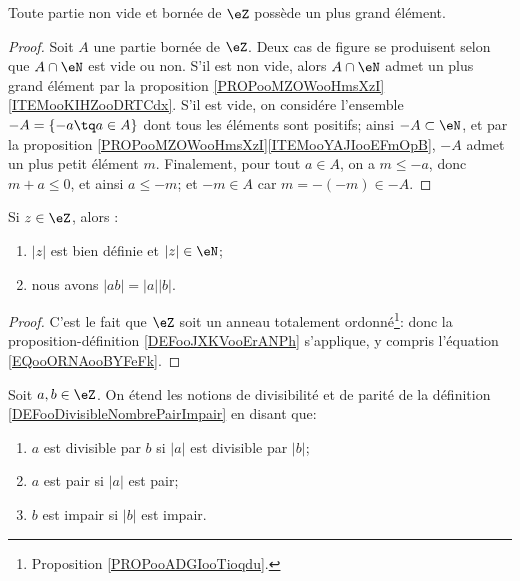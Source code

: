 \begin{lemma}       \label{LEMooMYEIooNFwNVI}
	Toute partie non vide et bornée de \( \eZ\) possède un plus grand élément.
\end{lemma}

\begin{proof}
	Soit \( A \) une partie bornée de \( \eZ\). Deux cas de figure se produisent selon que \( A \cap \eN \) est vide ou non. S'il est non vide, alors \( A \cap \eN \) admet un plus grand élément par la proposition \ref{PROPooMZOWooHmsXzI}\ref{ITEMooKIHZooDRTCdx}. S'il est vide, on considére l'ensemble \( -A = \{-a \tq a \in A \} \) dont tous les éléments sont positifs; ainsi \( -A \subset \eN \), et par la proposition \ref{PROPooMZOWooHmsXzI}\ref{ITEMooYAJIooEFmOpB}, \( -A \) admet un plus petit élément \( m \). Finalement, pour tout \( a \in A \), on a \( m \leq -a \), donc \( m+a \leq 0 \), et ainsi \( a \leq -m \); et \( -m \in A \) car \( m = -(-m) \in -A \).
\end{proof}

\begin{proposition}	\label{PROPooRelatifsValAbs}
	Si \( z \in \eZ \), alors :
	\begin{enumerate}
		\item
		      \( |z| \) est bien définie et \( |z| \in \eN \);
		\item
		      nous avons \( | ab |=| a || b | \).
	\end{enumerate}
\end{proposition}

\begin{proof}
	C'est le fait que \( \eZ\) soit un anneau totalement ordonné\footnote{Proposition \ref{PROPooADGIooTioqdu}.}: donc la proposition-définition \ref{DEFooJXKVooErANPh} s'applique, y compris l'équation \eqref{EQooORNAooBYFeFk}.
\end{proof}


\begin{definition}	\label{DEFooRelatifsDiviseurParite}
	Soit \( a, b \in \eZ \). On étend les notions de divisibilité et de parité de la définition \ref{DEFooDivisibleNombrePairImpair} en disant que:
	\begin{enumerate}
		\item
		      \( a \) est divisible par \( b \) si \( |a| \) est divisible par \( |b| \);
		\item
		      \( a \) est pair si \( |a| \) est pair;
		\item
		      \( b \) est impair si \( |b| \) est impair.
	\end{enumerate}
\end{definition}


